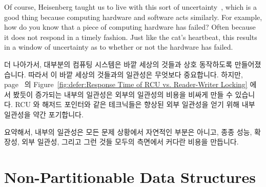 Of course, Heisenberg taught us to live with this sort of
uncertainty~\cite{WeinerHeisenberg1927Uncertain}, which is a good
thing because computing hardware and software acts similarly.
For example, how do you know that a piece of computing hardware
has failed?
Often because it does not respond in a timely fashion.
Just like the cat's heartbeat, this results in a window of
uncertainty as to whether or not the hardware has failed.
\fi

더 나아가서, 대부분의 컴퓨팅 시스템은 바깥 세상의 것들과 상호 동작하도록
만들어졌습니다.
따라서 이 바깥 세상의 것들과의 일관성은 무엇보다 중요합니다.
하지만,
page~\pageref{fig:defer:Response Time of RCU vs. Reader-Writer Locking} 의
Figure~\ref{fig:defer:Response Time of RCU vs. Reader-Writer Locking}
에서 봤듯이 증가되는 내부의 일관성은 외부의 일관성의 비용을 비싸게 만들 수
있습니다.
RCU 와 해저드 포인터와 같은 테크닉들은 향상된 외부 일관성을 얻기 위해 내부
일관성을 약간 포기합니다.

요약해서, 내부의 일관성은 모든 문제 상황에서 자연적인 부분은 아니고, 종종 성능,
확장성, 외부 일관성, 그리고 그런 것들 모두의 측면에서 커다란 비용을 만듭니다.

\section{Non-Partitionable Data Structures}
\label{sec:datastruct:Non-Partitionable Data Structures}

